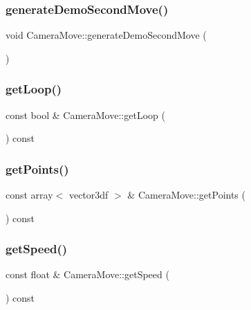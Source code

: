 \subsubsection{\texorpdfstring{generateDemoSecondMove()}{generateDemoSecondMove()}}
{\footnotesize\ttfamily void Camera\+Move\+::generate\+Demo\+Second\+Move (\begin{DoxyParamCaption}{ }\end{DoxyParamCaption})}

\mbox{\label{class_camera_move_a6e00aa01788a602f8739bdd475f5c7e6}} 
\subsubsection{\texorpdfstring{getLoop()}{getLoop()}}
{\footnotesize\ttfamily const bool \& Camera\+Move\+::get\+Loop (\begin{DoxyParamCaption}{ }\end{DoxyParamCaption}) const}

\mbox{\label{class_camera_move_aead3c97a2191291f3dcd767480d4106e}} 
\subsubsection{\texorpdfstring{getPoints()}{getPoints()}}
{\footnotesize\ttfamily const array$<$ vector3df $>$ \& Camera\+Move\+::get\+Points (\begin{DoxyParamCaption}{ }\end{DoxyParamCaption}) const}

\mbox{\label{class_camera_move_a5ede7abe6d5f9def855d41b2d455b8d5}} 
\subsubsection{\texorpdfstring{getSpeed()}{getSpeed()}}
{\footnotesize\ttfamily const float \& Camera\+Move\+::get\+Speed (\begin{DoxyParamCaption}{ }\end{DoxyParamCaption}) const}

